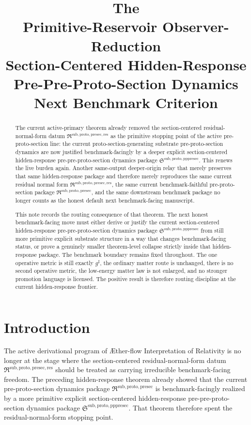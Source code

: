 \documentclass[11pt]{article}
\title{\textbf{The \TheoryName{}}\\[0.4em]
\large Primitive-Reservoir Observer-Reduction\\
\large Section-Centered Hidden-Response\\
\large Pre-Pre-Proto-Section Dynamics\\
\large Next Benchmark Criterion}
\author{}
\date{}
\newcommand{\Aflow}{\AE{}ther-flow}
\newcommand{\TheoryName}{\Aflow{} Interpretation of Relativity}
\newcommand{\CompletedMetric}{g^{\sharp}}
\newcommand{\PreProtoSectionPackage}{\mathfrak R^{\mathrm{sub,proto,presec}}}
\newcommand{\PreProtoSectionResidualPackage}{\mathfrak R^{\mathrm{sub,proto,presec,res}}}
\newcommand{\PrePreProtoSectionPackage}{\mathfrak S^{\mathrm{sub,proto,pppresec}}}
\begin{document}
\maketitle

\begin{abstract}
The current active-primary theorem already removed the section-centered residual-normal-form datum \(\PreProtoSectionResidualPackage\) as the primitive stopping point of the active pre-proto-section line: the current proto-section-generating substrate pre-proto-section dynamics are now justified benchmark-facingly by a deeper explicit section-centered hidden-response pre-pre-proto-section dynamics package \(\PrePreProtoSectionPackage\). This renews the live burden again. Another same-output deeper-origin relay that merely preserves that same hidden-response package and therefore merely reproduces the same current residual normal form \(\PreProtoSectionResidualPackage\), the same current benchmark-faithful pre-proto-section package \(\PreProtoSectionPackage\), and the same downstream benchmark package no longer counts as the honest default next benchmark-facing manuscript.

This note records the routing consequence of that theorem. The next honest benchmark-facing move must either derive or justify the current section-centered hidden-response pre-pre-proto-section dynamics package \(\PrePreProtoSectionPackage\) from still more primitive explicit substrate structure in a way that changes benchmark-facing status, or prove a genuinely smaller theorem-level collapse strictly inside that hidden-response package. The benchmark boundary remains fixed throughout. The one operative metric is still exactly \(\CompletedMetric\), the ordinary matter route is unchanged, there is no second operative metric, the low-energy matter law is not enlarged, and no stronger promotion language is licensed. The positive result is therefore routing discipline at the current hidden-response frontier.
\end{abstract}

\section{Introduction}

The active derivational program of \TheoryName{} is no longer at the stage where the section-centered residual-normal-form datum \(\PreProtoSectionResidualPackage\) should be treated as carrying irreducible benchmark-facing freedom. The preceding hidden-response theorem already showed that the current pre-proto-section dynamics package \(\PreProtoSectionPackage\) is benchmark-facingly realized by a more primitive explicit section-centered hidden-response pre-pre-proto-section dynamics package \(\PrePreProtoSectionPackage\). That theorem therefore spent the residual-normal-form stopping point.
\end{document}
